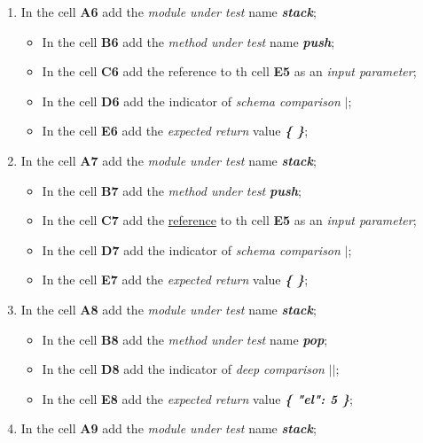 \begin{enumerate}
\begin{itemize}
	\end{itemize}
%	
	\item In the cell \textbf{A6} add the \textit{module under test} name\textit{ \textbf{stack}};
	\begin{itemize}
		\item In the cell \textbf{B6} add the \textit{method under test} name\textit{ \textbf{push}};
		\item In the cell \textbf{C6} add the reference to th cell \textbf{E5} as an \textit{ input parameter};
		\item In the cell \textbf{D6} add the indicator of \textit{schema comparison}\textit{\textbf{ $|$}};
		\item In the cell \textbf{E6} add the \textit{expected return} value\textit{ \textbf{ \{ \}}};
	\end{itemize}
%	
	\item In the cell \textbf{A7} add the \textit{module under test} name\textit{\textbf{ stack}};
	\begin{itemize}
		\item In the cell \textbf{B7} add the \textit{method under test} \textit{\textbf{push}};
		\item In the cell \textbf{C7} add the \underline{reference} to th cell \textbf{E5} as an\textit{ input parameter};
		\item In the cell \textbf{D7} add the indicator of \textit{schema comparison} \textit{\textbf{$|$}};
		\item In the cell \textbf{E7} add the \textit{expected return} value\textit{ \textbf{ \{ \}}};
	\end{itemize}
%	
	\item In the cell \textbf{A8} add the \textit{module under test} name\textit{ \textbf{stack}};
	\begin{itemize}
		\item In the cell \textbf{B8} add the \textit{method under test} name \textit{\textbf{pop}};
		\item In the cell \textbf{D8} add the indicator of \textit{deep comparison} \textit{\textbf{$||$}};
		\item In the cell \textbf{E8} add the \textit{expected return} value\textit{ \textbf{ \{ "el": 5 \}}};
	\end{itemize}
%	
	\item In the cell \textbf{A9} add the \textit{module under test} name\textit{ \textbf{stack}};

\end{enumerate}
